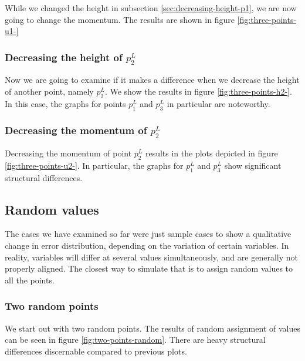 \documentclass{article}
\begin{document}
While we changed the height in subsection \ref{sec:decreasing-height-p1}, we are now going to change the momentum. The results are shown in figure \ref{fig:three-points-u1-}



\subsubsection{\texorpdfstring{Decreasing the height of $p_2^L$}{Decreasing the height of p2L}}
\label{sec:decreasing-height-p2}

Now we are going to examine if it makes a difference when we decrease the height of another point, namely $p_2^L$. We show the results in figure \ref{fig:three-points-h2-}. In this case, the graphs for points $p_1^L$ and $p_3^L$ in particular are noteworthy.



\subsubsection{\texorpdfstring{Decreasing the momentum of $p_2^L$}{Decreasing the momentum of p2L}}
\label{sec:decreasing-momentum-of-p2}

Decreasing the momentum of point $p_2^L$ results in the plots depicted in figure \ref{fig:three-points-u2-}. In particular, the graphs for $p_1^L$ and $p_3^L$ show significant structural differences.



\subsection{Random values}
\label{sec:random-values}

The cases we have examined so far were just sample cases to show a qualitative change in error distribution, depending on the variation of certain variables. In reality, variables will differ at several values simultaneously, and are generally not properly aligned. The closest way to simulate that is to assign random values to all the points.

\subsubsection{Two random points}
\label{sec:two-random-points}

We start out with two random points. The results of random assignment of values can be seen in figure \ref{fig:two-points-random}. There are heavy structural differences discernable compared to previous plots.
\end{document}
